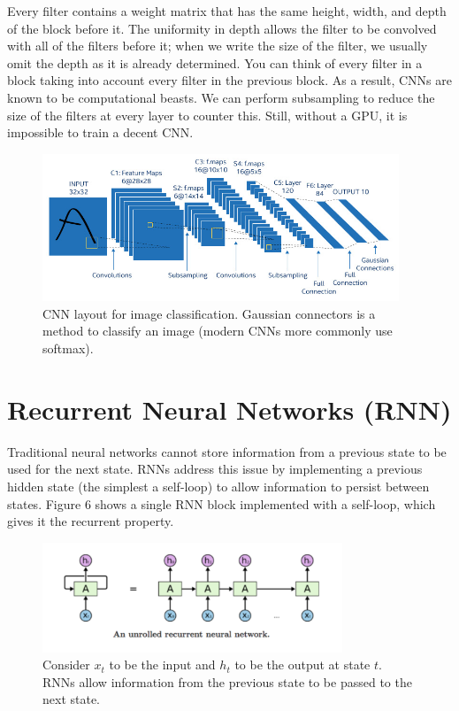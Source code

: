 \documentclass{article}
\begin{document}
Every filter contains a weight matrix that has the same height, width, and depth of the block before it. The uniformity in depth allows the filter to be convolved with all of the filters before it; when we write the size of the filter, we usually omit the depth as it is already determined. You can think of every filter in a block taking into account every filter in the previous block. As a result, CNNs are known to be computational beasts. We can perform subsampling to reduce the size of the filters at every layer to counter this. Still, without a GPU, it is impossible to train a decent CNN.

\begin{figure}[H]
    \begin{center}
        \includegraphics[width=0.95\textwidth]{CNN.jpg}
    \end{center}
    \vspace{-10pt}
    \caption{CNN layout for image classification. Gaussian connectors is a method to classify an image (modern CNNs more commonly use softmax).}
\end{figure}

\section{Recurrent Neural Networks (RNN)}
Traditional neural networks cannot store information from a previous state to be used for the next state. RNNs address this issue by implementing a previous hidden state (the simplest a self-loop) to allow information to persist between states. Figure 6 shows a single RNN block implemented with a self-loop, which gives it the recurrent property. 

\begin{figure}[H]
    \begin{center}
        \includegraphics[width=0.8\textwidth]{RNN.jpg}
    \end{center}
    \vspace{-10pt}
    \caption{Consider $x_t$ to be the input and $h_t$ to be the output at state $t$. RNNs allow information from the previous state to be passed to the next state.}
\end{figure}
\end{document}
